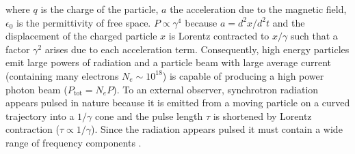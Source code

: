 \documentclass[../main.tex]{subfiles}
\begin{document}
where $q$ is the charge of the particle, $a$ the acceleration due to the magnetic field, $\epsilon_{0}$ is the permittivity of free space. $P \propto \gamma^{4}$ because $a = d^{2}x/d^{2}t$ and the displacement of the charged particle $x$ is Lorentz contracted to $x/\gamma$ such that a factor $\gamma^{2}$ arises due to each acceleration term. Consequently, high energy particles emit large powers of radiation and a particle beam with large average current (containing many electrons $N_{e}\sim 10^{18}$) is capable of producing a high power photon beam ($P_{\mathrm{tot}}=N_{e}P$). To an external observer, synchrotron radiation appears pulsed in nature because it is emitted from a moving particle on a curved trajectory into a $1/\gamma$ cone and the pulse length $\tau$ is shortened by Lorentz contraction ($\tau \propto 1/\gamma$). Since the radiation appears pulsed it must contain a wide range of frequency components \cite{appleby2020science}.  
\end{document}
